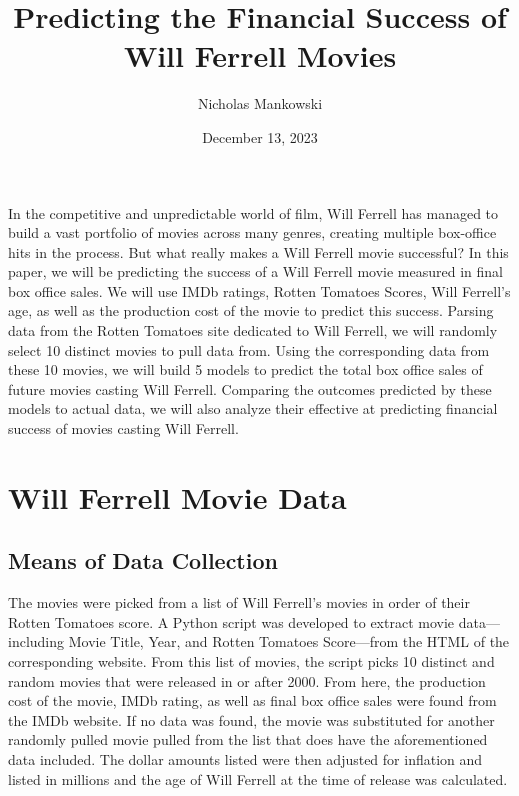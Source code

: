 \documentclass[11pt]{article}
\title{Predicting the Financial Success of Will Ferrell Movies}
\author{Nicholas Mankowski}
\date{December 13, 2023} %
\begin{document}
\maketitle

In the competitive and unpredictable world of film, Will Ferrell has managed to build a vast portfolio of movies across many genres, creating multiple box-office hits in the process. But what really makes a Will Ferrell movie successful? In this paper, we will be predicting the success of a Will Ferrell movie measured in final box office sales.  
We will use IMDb ratings, Rotten Tomatoes Scores, Will Ferrell's age, as well as the production cost of the movie to predict this success. 
Parsing data from the Rotten Tomatoes site dedicated to Will Ferrell, we will randomly select 10 distinct movies to pull data from. 
Using the corresponding data from these 10 movies, we will build 5 models to predict the total box office sales of future movies casting Will Ferrell.  
Comparing the outcomes predicted by these models to actual data, we will also analyze their effective at predicting financial success of movies casting Will Ferrell.

\section{\centering Will Ferrell Movie Data}
\label{movie-data}


\subsection{\centering Means of Data Collection} %
The movies were picked from a list of Will Ferrell's movies in order of their Rotten Tomatoes score.  
A Python script was developed to extract movie data—including Movie Title, Year, and Rotten Tomatoes Score—from the HTML of the corresponding website.
From this list of movies, the script picks 10 distinct and random movies that were released in or after 2000.  
From here, the production cost of the movie, IMDb rating, as well as final box office sales were found from the IMDb website.  
If no data was found, the movie was substituted for another randomly pulled movie pulled from the list that does have the aforementioned data included.
The dollar amounts listed were then adjusted for inflation and listed in millions and the age of Will Ferrell at the time of release was calculated.
\end{document}
